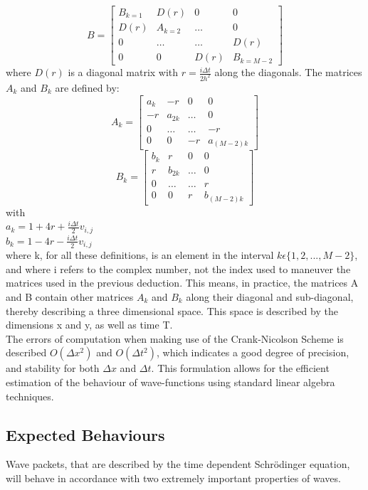 \documentclass[10pt, nofootinbib, twocolumn]{revtex4-1}
\begin{document}
\[
B = 
\begin{bmatrix}
    B_{k=1} & D(r) & 0 & 0 \\
    D(r) & A_{k=2} & \ldots & 0 \\
    0 & \ldots & \ldots & D(r) \\
    0 & 0 & D(r) & B_{k=M-2}
\end{bmatrix}
\]
where \( D(r) \) is a diagonal matrix with $r = \frac{i \Delta t}{2 h^2}$ along the diagonals. The matrices \( A_k \) and \( B_k \) are defined by:
\[
A_k = 
\begin{bmatrix}
    a_{k} & -r & 0 & 0 \\
    -r & a_{2k} & \ldots & 0 \\
    0 & \ldots & \ldots & -r \\
    0 & 0 & -r & a_{(M-2)k}
\end{bmatrix}
\]
\[
B_k = 
\begin{bmatrix}
    b_{k} & r & 0 & 0 \\
    r & b_{2k} & \ldots & 0 \\
    0 & \ldots & \ldots & r \\
    0 & 0 & r & b_{(M-2)k}
\end{bmatrix}
\] 
\newpage
with\\
\( a_k = 1 + 4r + \frac{i \Delta t}{2} v_{i,j} \) \\ 
\( b_k = 1 - 4r - \frac{i \Delta t}{2} v_{i,j} \) \\

where k, for all these definitions, is an element in the interval $k\epsilon \{1,2,...,M-2\}$, and 
where i refers to the complex number, not the index used to maneuver the matrices used in the previous deduction. This means, in practice, the matrices A and B contain other matrices $A_k$ and $B_k$ along their diagonal and sub-diagonal, thereby describing a three dimensional space. This space is described by the dimensions x and y, as well as time T. \\

The errors of computation when making use of the Crank-Nicolson Scheme is described \cite[p. ~312]{notes} $O(\Delta x^2)$ and $O(\Delta t^2)$, which indicates a good degree of precision, and stability for both $\Delta x$ and $\Delta t$. This formulation allows for the efficient estimation of the behaviour of wave-functions using standard linear algebra techniques.


\subsection{Expected Behaviours}\label{sec:behaviour}
Wave packets, that are described by the time dependent Schrödinger equation, will behave in accordance with two extremely important properties of waves. 
\end{document}
